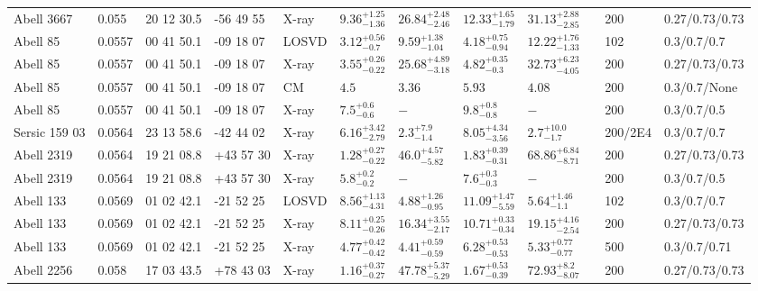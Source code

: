 \begin{landscape}
\begin{center}
{\begin{longtable}{llllllllllll}
Abell 3667 & 0.055 & 20 12 30.5 & -56 49 55 & X-ray & ${9.36}^{+1.25}_{-1.36}$ & ${26.84}^{+2.48}_{-2.46}$ & ${12.33}^{+1.65}_{-1.79}$ & ${31.13}^{+2.88}_{-2.85}$ & \citet{BA14.1} & 200 & 0.27/0.73/0.73 \\
Abell 85 & 0.0557 & 00 41 50.1 & -09 18 07 & LOSVD & ${3.12}^{+0.56}_{-0.7}$ & ${9.59}^{+1.38}_{-1.04}$ & ${4.18}^{+0.75}_{-0.94}$ & ${12.22}^{+1.76}_{-1.33}$ & \citet{WO10.1} & 102 & 0.3/0.7/0.7 \\
Abell 85 & 0.0557 & 00 41 50.1 & -09 18 07 & X-ray & ${3.55}^{+0.26}_{-0.22}$ & ${25.68}^{+4.89}_{-3.18}$ & ${4.82}^{+0.35}_{-0.3}$ & ${32.73}^{+6.23}_{-4.05}$ & \citet{BA14.1} & 200 & 0.27/0.73/0.73 \\
Abell 85 & 0.0557 & 00 41 50.1 & -09 18 07 & CM & ${4.5}^{}_{}$ & ${3.36}^{}_{}$ & ${5.93}^{}_{}$ & ${4.08}^{}_{}$ & \citet{RI06.1} & 200 & 0.3/0.7/None \\
Abell 85 & 0.0557 & 00 41 50.1 & -09 18 07 & X-ray & ${7.5}^{+0.6}_{-0.6}$ & ${-}^{}_{}$ & ${9.8}^{+0.8}_{-0.8}$ & ${-}^{}_{}$ & \citet{XU01.1} & 200 & 0.3/0.7/0.5 \\
Sersic 159 03 & 0.0564 & 23 13 58.6 & -42 44 02 & X-ray & ${6.16}^{+3.42}_{-2.79}$ & ${2.3}^{+7.9}_{-1.4}$ & ${8.05}^{+4.34}_{-3.56}$ & ${2.7}^{+10.0}_{-1.7}$ & \citet{VO06.1} & 200/2E4 & 0.3/0.7/0.7 \\
Abell 2319 & 0.0564 & 19 21 08.8 & +43 57 30 & X-ray & ${1.28}^{+0.27}_{-0.22}$ & ${46.0}^{+4.57}_{-5.82}$ & ${1.83}^{+0.39}_{-0.31}$ & ${68.86}^{+6.84}_{-8.71}$ & \citet{BA14.1} & 200 & 0.27/0.73/0.73 \\
Abell 2319 & 0.0564 & 19 21 08.8 & +43 57 30 & X-ray & ${5.8}^{+0.2}_{-0.2}$ & ${-}^{}_{}$ & ${7.6}^{+0.3}_{-0.3}$ & ${-}^{}_{}$ & \citet{XU01.1} & 200 & 0.3/0.7/0.5 \\
Abell 133 & 0.0569 & 01 02 42.1 & -21 52 25 & LOSVD & ${8.56}^{+1.13}_{-4.31}$ & ${4.88}^{+1.26}_{-0.95}$ & ${11.09}^{+1.47}_{-5.59}$ & ${5.64}^{+1.46}_{-1.1}$ & \citet{WO10.1} & 102 & 0.3/0.7/0.7 \\
Abell 133 & 0.0569 & 01 02 42.1 & -21 52 25 & X-ray & ${8.11}^{+0.25}_{-0.26}$ & ${16.34}^{+3.55}_{-2.17}$ & ${10.71}^{+0.33}_{-0.34}$ & ${19.15}^{+4.16}_{-2.54}$ & \citet{BA14.1} & 200 & 0.27/0.73/0.73 \\
Abell 133 & 0.0569 & 01 02 42.1 & -21 52 25 & X-ray & ${4.77}^{+0.42}_{-0.42}$ & ${4.41}^{+0.59}_{-0.59}$ & ${6.28}^{+0.53}_{-0.53}$ & ${5.33}^{+0.77}_{-0.77}$ & \citet{VI06.1} & 500 & 0.3/0.7/0.71 \\
Abell 2256 & 0.058 & 17 03 43.5 & +78 43 03 & X-ray & ${1.16}^{+0.37}_{-0.27}$ & ${47.78}^{+5.37}_{-5.29}$ & ${1.67}^{+0.53}_{-0.39}$ & ${72.93}^{+8.2}_{-8.07}$ & \citet{BA14.1} & 200 & 0.27/0.73/0.73 \\

\end{longtable}}
\end{center}
\end{landscape}

